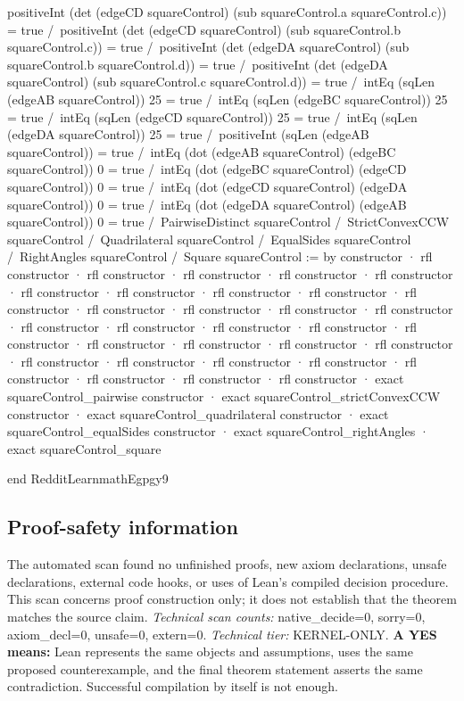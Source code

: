 \documentclass[11pt]{article}
\begin{document}
\begin{Vlean}
    positiveInt (det (edgeCD squareControl)
      (sub squareControl.a squareControl.c)) = true /\
    positiveInt (det (edgeCD squareControl)
      (sub squareControl.b squareControl.c)) = true /\
    positiveInt (det (edgeDA squareControl)
      (sub squareControl.b squareControl.d)) = true /\
    positiveInt (det (edgeDA squareControl)
      (sub squareControl.c squareControl.d)) = true /\
    intEq (sqLen (edgeAB squareControl)) 25 = true /\
    intEq (sqLen (edgeBC squareControl)) 25 = true /\
    intEq (sqLen (edgeCD squareControl)) 25 = true /\
    intEq (sqLen (edgeDA squareControl)) 25 = true /\
    positiveInt (sqLen (edgeAB squareControl)) = true /\
    intEq (dot (edgeAB squareControl) (edgeBC squareControl)) 0 = true /\
    intEq (dot (edgeBC squareControl) (edgeCD squareControl)) 0 = true /\
    intEq (dot (edgeCD squareControl) (edgeDA squareControl)) 0 = true /\
    intEq (dot (edgeDA squareControl) (edgeAB squareControl)) 0 = true /\
    PairwiseDistinct squareControl /\
    StrictConvexCCW squareControl /\
    Quadrilateral squareControl /\
    EqualSides squareControl /\
    RightAngles squareControl /\
    Square squareControl := by
  constructor
  · rfl
  constructor
  · rfl
  constructor
  · rfl
  constructor
  · rfl
  constructor
  · rfl
  constructor
  · rfl
  constructor
  · rfl
  constructor
  · rfl
  constructor
  · rfl
  constructor
  · rfl
  constructor
  · rfl
  constructor
  · rfl
  constructor
  · rfl
  constructor
  · rfl
  constructor
  · rfl
  constructor
  · rfl
  constructor
  · rfl
  constructor
  · rfl
  constructor
  · rfl
  constructor
  · rfl
  constructor
  · rfl
  constructor
  · rfl
  constructor
  · rfl
  constructor
  · rfl
  constructor
  · rfl
  constructor
  · rfl
  constructor
  · rfl
  constructor
  · rfl
  constructor
  · rfl
  constructor
  · rfl
  constructor
  · rfl
  constructor
  · exact squareControl_pairwise
  constructor
  · exact squareControl_strictConvexCCW
  constructor
  · exact squareControl_quadrilateral
  constructor
  · exact squareControl_equalSides
  constructor
  · exact squareControl_rightAngles
  · exact squareControl_square

end RedditLearnmathEgpgy9

\end{Vlean}
\subsection*{Proof-safety information}
The automated scan found no unfinished proofs, new axiom declarations, unsafe declarations, external code hooks, or uses of Lean's compiled decision procedure. This scan concerns proof construction only; it does not establish that the theorem matches the source claim.
\textit{Technical scan counts:} native\_decide=0, sorry=0, axiom\_decl=0, unsafe=0, extern=0. \textit{Technical tier:} KERNEL-ONLY.
\textbf{A YES means:} Lean represents the same objects and assumptions, uses the same proposed counterexample, and the final theorem statement asserts the same contradiction. Successful compilation by itself is not enough.
\clearpage
\end{document}

